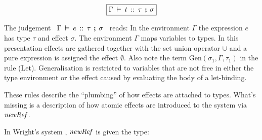 \vspace{-1em}
\begin{displaymath}
\tfbox{\Gamma \judge t \hastype \tau \with \sigma}
\end{displaymath}


 
The judgement \ $\Gamma \hspace{2pt} \boldsymbol{\vdash} \hspace{2pt} e \hspace{2pt} :: \hspace{2pt} \tau \hspace{4pt} \textbf{;} \hspace{4pt} \sigma$ \ reads: In the environment $\Gamma$ the expression $e$ has type $\tau$ and effect $\sigma$. The environment $\Gamma$ maps variables to types. In this presentation effects are gathered together with the set union operator $\cup$ and a pure expression is assigned the effect $\emptyset$. Also note the term $\textrm{Gen}(\sigma_1, \Gamma, \tau_1)$ in the rule (Let). Generalisation is restricted to variables that are not free in either the type environment or the effect caused by evaluating the body of a let-binding.

These rules describe the ``plumbing'' of how effects are attached to types. What's missing is a description of how atomic effects are introduced to the system via $\operatorname{\mathit{newRef}}$.

In Wright's system \cite{wright:references-effect}, $\operatorname{\mathit{newRef}}$ is given the type:

